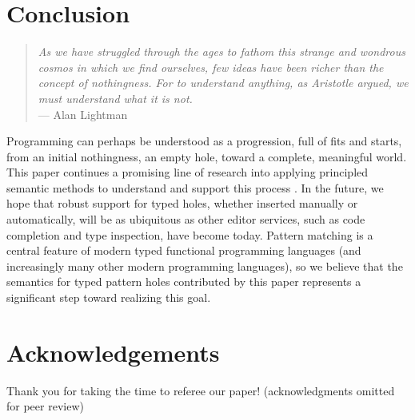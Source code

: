 \section{Conclusion}
\begin{quote}
    \emph{As we have struggled through the ages to fathom this strange and wondrous cosmos in which we find ourselves, few ideas have been richer than the concept of nothingness. For to understand anything, as Aristotle argued, we must understand what it is not.}
    \\\null\hfill --- Alan Lightman
\end{quote}

\noindent
Programming can perhaps be understood as a progression, full of fits and starts, from an initial nothingness, an empty hole, toward a complete, meaningful world. This paper continues a promising line of research into applying principled semantic methods to understand and support this process \cite{DBLP:conf/popl/OmarVHAH17,HazelnutSNAPL}. In the future, we hope that robust support for typed holes, whether inserted manually or automatically, will be as ubiquitous as other editor services, such as code completion and type inspection, have become today. 
Pattern matching is a central feature of modern typed functional programming languages (and increasingly many other modern 
programming languages), so we believe that the semantics for typed pattern holes contributed by this paper represents a significant step toward realizing this goal.

\section*{Acknowledgements}
Thank you for taking the time to referee our paper! (acknowledgments 
omitted for peer review)


